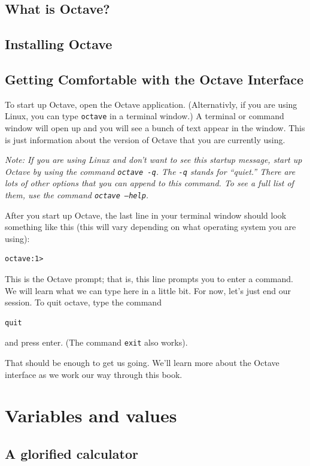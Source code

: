 \documentclass{book}
\begin{document}
\section{What is Octave?}

\section{Installing Octave}

\section{Getting Comfortable with the Octave Interface}

To start up Octave, open the Octave application. (Alternativly, if you are using
Linux, you can type {\tt octave} in a terminal window.) A terminal or command
window will open up and you will see a bunch of text appear in the window. This
is just information about the version of Octave that you are
currently using.

{\it Note: If you are using Linux and don't want to see this startup message,
start up Octave by using the command {\tt octave -q}. The {\tt -q} stands for
``quiet.'' There are lots of other options that you can
append to this command. To see a full list of them, use the command {\tt octave
--help}.}

After you start up Octave, the last line in your terminal window should look
something like this (this will vary depending on what operating system you are
using):
%
\begin{verbatim}
octave:1> 
\end{verbatim}
%
This is the Octave prompt; that is, this line prompts you
to enter a command. We will learn what we can type here in a little bit. For
now, let's just end our session. To quit octave, type the command
%
\begin{verbatim}
quit
\end{verbatim}
%
and press enter. (The command {\tt exit} also works).

That should be enough to get us going. We'll learn more about the Octave
interface as we work our way through this book.


\chapter{Variables and values}

\section{A glorified calculator}
\label{calc}
\end{document}
